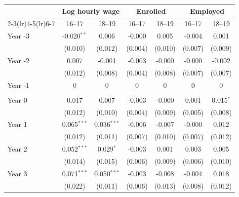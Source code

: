 \begin{tabular}{lcccccc}
\toprule
 & \multicolumn{2}{c}{Log hourly wage} & \multicolumn{2}{c}{Enrolled} & \multicolumn{2}{c}{Employed} \\
\cmidrule(lr){2-3}\cmidrule(lr){4-5}\cmidrule(lr){6-7}
 & 16--17 & 18--19 & 16--17 & 18--19 & 16--17 & 18--19 \\
\midrule
Year -3 & -0.020$^{**}$ & 0.006 & -0.000 & 0.005 & -0.004 & 0.001 \\
 & (0.010) & (0.012) & (0.004) & (0.010) & (0.007) & (0.009) \\
Year -2 & 0.007 & -0.001 & -0.003 & -0.000 & -0.000 & -0.002 \\
 & (0.012) & (0.008) & (0.004) & (0.008) & (0.007) & (0.007) \\
Year -1 & 0 & 0 & 0 & 0 & 0 & 0 \\
 &  &  &  &  &  &  \\
Year 0 & 0.017 & 0.007 & -0.003 & -0.000 & 0.001 & 0.015$^{*}$ \\
 & (0.012) & (0.010) & (0.004) & (0.009) & (0.005) & (0.008) \\
Year 1 & 0.065$^{***}$ & 0.036$^{***}$ & -0.006 & -0.007 & -0.000 & 0.012 \\
 & (0.012) & (0.011) & (0.007) & (0.010) & (0.007) & (0.012) \\
Year 2 & 0.052$^{***}$ & 0.029$^{*}$ & -0.003 & 0.001 & 0.003 & 0.005 \\
 & (0.014) & (0.015) & (0.006) & (0.009) & (0.006) & (0.010) \\
Year 3 & 0.071$^{***}$ & 0.050$^{***}$ & -0.003 & -0.008 & -0.004 & 0.018 \\
 & (0.022) & (0.011) & (0.006) & (0.013) & (0.008) & (0.012) \\
\bottomrule
\end{tabular}
